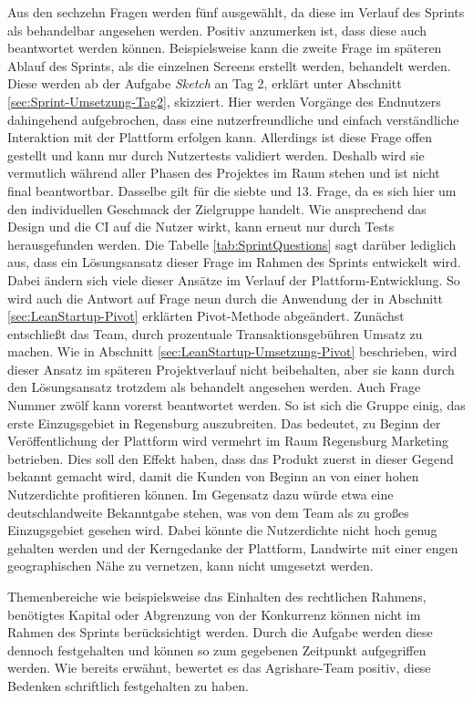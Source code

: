 Aus den sechzehn Fragen werden fünf ausgewählt, da diese im Verlauf des Sprints als behandelbar angesehen werden. Positiv anzumerken ist, dass diese auch beantwortet werden können. Beispielsweise kann die zweite Frage im späteren Ablauf des Sprints, als die einzelnen Screens erstellt werden, behandelt werden. Diese werden ab der Aufgabe \textit{Sketch} an Tag 2, erklärt unter Abschnitt \ref{sec:Sprint-Umsetzung-Tag2}, skizziert. Hier werden Vorgänge des Endnutzers dahingehend aufgebrochen, dass eine nutzerfreundliche und einfach verständliche Interaktion mit der Plattform erfolgen kann. Allerdings ist diese Frage offen gestellt und kann nur durch Nutzertests validiert werden. Deshalb wird sie vermutlich während aller Phasen des Projektes im Raum stehen und ist nicht final beantwortbar. Dasselbe gilt für die siebte und 13. Frage, da es sich hier um den individuellen Geschmack der Zielgruppe handelt. Wie ansprechend das Design und die \ac{CI} auf die Nutzer wirkt, kann erneut nur durch Tests herausgefunden werden. Die Tabelle \ref{tab:SprintQuestions} sagt darüber lediglich aus, dass ein Lösungsansatz dieser Frage im Rahmen des Sprints entwickelt wird. Dabei ändern sich viele dieser Ansätze im Verlauf der Plattform-Entwicklung. So wird auch die Antwort auf Frage neun durch die Anwendung der in Abschnitt \ref{sec:LeanStartup-Pivot} erklärten Pivot-Methode abgeändert. Zunächst entschließt das Team, durch prozentuale Transaktionsgebühren Umsatz zu machen. Wie in Abschnitt \ref{sec:LeanStartup-Umsetzung-Pivot} beschrieben, wird dieser Ansatz im späteren Projektverlauf nicht beibehalten, aber sie kann durch den Lösungsansatz trotzdem als behandelt angesehen werden. Auch Frage Nummer zwölf kann vorerst beantwortet werden. So ist sich die Gruppe einig, das erste Einzugsgebiet in Regensburg auszubreiten. Das bedeutet, zu Beginn der Veröffentlichung der Plattform wird vermehrt im Raum Regensburg Marketing betrieben. Dies soll den Effekt haben, dass das Produkt zuerst in dieser Gegend bekannt gemacht wird, damit die Kunden von Beginn an von einer hohen Nutzerdichte profitieren können. Im Gegensatz dazu würde etwa eine deutschlandweite Bekanntgabe stehen, was von dem Team als zu großes Einzugsgebiet gesehen wird. Dabei könnte die Nutzerdichte nicht hoch genug gehalten werden und der Kerngedanke der Plattform, Landwirte mit einer engen geographischen Nähe zu vernetzen, kann nicht umgesetzt werden. 

Themenbereiche wie beispielsweise das Einhalten des rechtlichen Rahmens, benötigtes Kapital oder Abgrenzung von der Konkurrenz können nicht im Rahmen des Sprints berücksichtigt werden. Durch die Aufgabe werden diese dennoch festgehalten und können so zum gegebenen Zeitpunkt aufgegriffen werden. Wie bereits erwähnt, bewertet es das Agrishare-Team positiv, diese Bedenken schriftlich festgehalten zu haben.

